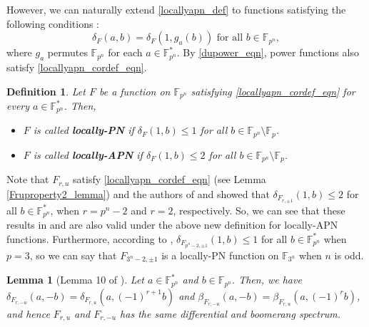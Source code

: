 \documentclass[11pt]{article}
\numberwithin{theorem}{section}
\newtheorem{lemma}[theorem]{Lemma}
\newtheorem{defi}[theorem]{Definition}
\newcommand{\F}{\mathbb F}
\newcommand{\Fp}{\mathbb{F}_{p}}
\newcommand{\Fpn}{\mathbb{F}_{p^n}}
\newcommand{\Fpnmul}{\mathbb{F}_{p^n}^*}
\begin{document}
However, we can naturally extend \eqref{locallyapn_def} to functions satisfying the following conditions :
\begin{equation}\label{locallyapn_cordef_eqn}
	\delta_F(a,b)= \delta_F(1,g_a(b))\text{ for all }b\in \Fpn,
\end{equation}
where $g_a$ permutes $\Fpn$ for each $a\in\Fpnmul$. By \eqref{dupower_eqn}, power functions also satisfy \eqref{locallyapn_cordef_eqn}.

\begin{defi}\label{locallyapn_cordef}
	Let $F$ be a function on $\Fpn$ satisfying \eqref{locallyapn_cordef_eqn} for every $a\in \Fpnmul$. Then, 
	\begin{itemize}
		\item $F$ is called \textbf{locally-PN} if $\delta_F(1,b)\le 1$ for all $b\in \Fpn\setminus \Fp$.
		\item $F$ is called \textbf{locally-APN} if $\delta_F(1,b)\le 2$ for all $b\in \Fpn\setminus \Fp$.
	\end{itemize}
\end{defi}

Note that $F_{r,u}$ satisfy \eqref{locallyapn_cordef_eqn} (see Lemma \ref{Fruproperty2_lemma}) and the authors of \cite{LWZ24} and \cite{MW25} showed that $\delta_{F_{r,\pm1}}(1,b)\le 2$ for all $b\in \Fpnmul$, when $r=p^n-2$ and $r=2$, respectively. So, we can see that these results in \cite{LWZ24} and \cite{MW25} are also valid under the above new definition for locally-APN functions. Furthermore, according to \cite{LWZ24}, $\delta_{F_{p^n-2,\pm1}}(1,b)\le 1$ for all $b\in \Fpnmul$ when $p=3$, so we can say that  $F_{3^n-2,\pm1}$ is a locally-PN function on $\F_{3^n}$ when $n$ is odd.







\begin{lemma}[Lemma 10 of \cite{MW25}]\label{Fruproperty1_lemma}
	Let $a\in \Fpnmul$ and $b\in \Fpn$. Then, we have $\delta_{F_{r,-u}}(a,-b)=\delta_{F_{r,u}}(a,(-1)^{r+1}b)$ and $\beta_{F_{r,-u}}(a,-b)=\beta_{F_{r,u}}(a,(-1)^{r}b)$, and hence $F_{r,u}$ and $F_{r,-u}$ has the same differential and boomerang spectrum.
\end{lemma}
\end{document}
